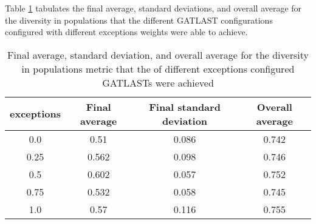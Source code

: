 Table \ref{tab:HP:GA:Exceptions:diversity in populations} tabulates the final average, standard deviations, and overall average for the diversity in populations that the different GATLAST configurations configured with different exceptions weights were able to achieve.
\begin{table}[tbh!]
\centering
\begin{adjustbox}{trim=0cm 0cm 0cm 0cm, clip=true}
\begin{tabular}{|c|c|c|c|}
\hline
exceptions & Final average & Final standard deviation & Overall average\\
\hline
0.0 & 0.51 & 0.086 & 0.742\\\hline
0.25 & 0.562 & 0.098 & 0.746\\\hline
0.5 & 0.602 & 0.057 & 0.752\\\hline
0.75 & 0.532 & 0.058 & 0.745\\\hline
1.0 & 0.57 & 0.116 & 0.755\\\hline
\end{tabular}
\end{adjustbox}
\caption{Final average, standard deviation, and overall average for the diversity in populations metric that the of different exceptions configured GATLASTs were achieved}
\label{tab:HP:GA:Exceptions:diversity in populations}
\end{table}